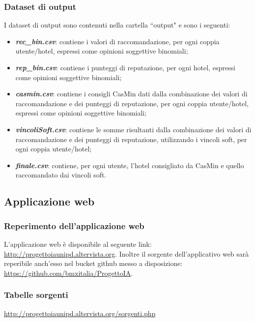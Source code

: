 \documentclass{report}
\begin{document}
		\subsubsection{Dataset di output}
		I dataset di output sono contenuti nella cartella ``output" e sono i seguenti:
		\begin{itemize}
			\item \textbf{\textit{rec\_bin.csv}}: contiene i valori di raccomandazione, per ogni coppia utente/hotel, espressi come opinioni
			 soggettive
			binomiali;
			\item \textbf{\textit{rep\_bin.csv}}: contiene i punteggi di reputazione, per ogni hotel, espressi come opinioni soggettive
			binomiali;
			\item \textbf{\textit{casmin.csv}}: contiene i consigli CasMin dati dalla combinazione dei valori di raccomandazione e dei
			 punteggi di
			reputazione, per ogni coppia utente/hotel, espressi come opinioni soggettive binomiali;
			\item \textbf{\textit{vincoliSoft.csv}}: contiene le somme risultanti dalla combinazione dei valori di raccomandazione e dei
			 punteggi di
			reputazione, utilizzando i vincoli soft, per ogni coppia utente/hotel;
			\item \textbf{\textit{finale.csv}}: contiene, per ogni utente, l'hotel consigliato da CasMin e quello raccomandato dai vincoli
			soft.
		\end{itemize}
		
	\subsection{Applicazione web}
	\subsubsection{Reperimento dell'applicazione web}
	L'applicazione web è disponibile al seguente link: \url{http://progettoiaunipd.altervista.org}. 
	\newline
	Inoltre il sorgente dell'applicativo web sarà reperibile anch'esso nel bucket github messo a disposizione: \url{https://github.com/bmxitalia/ProgettoIA}.
	
	\subsubsection{Tabelle sorgenti}

	\url{http://progettoiaunipd.altervista.org/sorgenti.php}
	\newline
	
\end{document}
